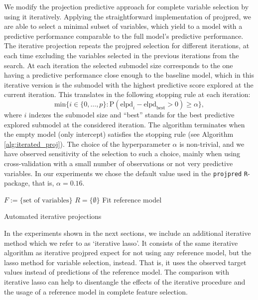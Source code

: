 \documentclass[a4]{article}
\theoremstyle{definition}
\begin{document}
We modify the projection predictive approach for complete variable
selection by using it iteratively.  Applying the straightforward
implementation of projpred, we are able to select a minimal subset of
variables, which yield to a model with a predictive performance
comparable to the full model's predictive performance. 
 The iterative projection repeats
the projpred selection for different iterations, at each time
excluding the variables selected in the previous
iterations from the search.
 At each iteration the selected submodel size corresponds to the
one having a predictive performance close enough to the baseline
model, which in this iterative version is the submodel with the
highest predictive score explored at the current iteration. This translates
in the following stopping rule at each iteration:
\begin{equation} 
\label{eq:rule_of_thumb}
\text{min} \{i\in \{0,\ldots,p\}: \text{P}(\text{elpd}_{i}-\text{elpd}_{\text{best}}>0)\geq \alpha \},
\end{equation}
where $i$ indexes the submodel size and ``best'' stands for the best predictive explored submodel
at the considered iteration. The algorithm terminates when the empty model (only intercept) satisfies
the stopping rule (see Algorithm \ref{alg:iterated_proj}).
The choice of the hyperparameter $\alpha$ is non-trivial, and we have 
observed sensitivity of the selection to such a choice, mainly when using cross-validation with a small
number of observations or not very predictive variables. 
In our experiments we chose the default value used in the \texttt{projpred} 
\texttt{R}-package, that is, $\alpha=0.16$.

\begin{center}
\begin{algorithm}[H]
\SetAlgoLined
{}
 $F:=\{\text{set of variables}\}$ \;
 $R=\{\emptyset\}$ \;
 Fit reference model\;
 \caption{Automated iterative projections}
 \label{alg:iterated_proj}
\end{algorithm}
\end{center}

In the experiments shown in the next sections, we include an additional iterative
method which we refer to as `iterative lasso'. It consists of the same iterative
algorithm as iterative projpred expect for not using any reference model, but
the lasso method for variable selection, instead.
That is, it uses the observed target values instead of predictions of the reference model.
The comparison with iterative lasso can help to disentangle the effects
of the iterative procedure and the usage of a reference model in complete feature selection.
\end{document}
